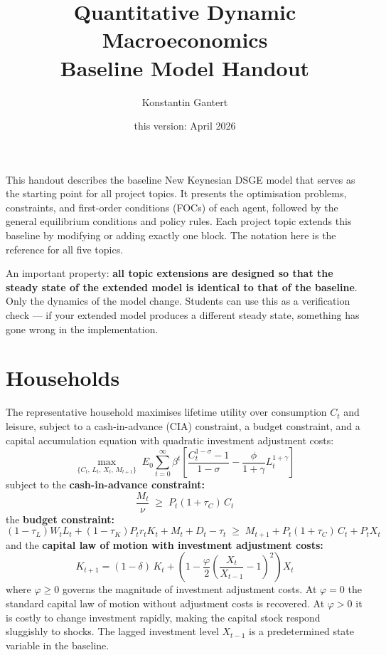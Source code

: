 \documentclass[11pt, a4paper]{article}
\title{\textbf{Quantitative Dynamic Macroeconomics}\\[0.4em]
\large Baseline Model Handout}
\author{Konstantin Gantert}
\date{this version: April 2026}
\begin{document}
\maketitle

This handout describes the baseline New Keynesian DSGE model that serves as the
starting point for all project topics. It presents the optimisation problems,
constraints, and first-order conditions (FOCs) of each agent, followed by the
general equilibrium conditions and policy rules. Each project topic extends this
baseline by modifying or adding exactly one block. The notation here is the
reference for all five topics.

An important property: \textbf{all topic extensions are designed so that
the steady state of the extended model is identical to that of the baseline}.
Only the dynamics of the model change. Students can use this as a verification
check --- if your extended model produces a different steady state, something
has gone wrong in the implementation.

\section{Households}

The representative household maximises lifetime utility over consumption $C_t$
and leisure, subject to a cash-in-advance (CIA) constraint, a budget constraint,
and a capital accumulation equation with quadratic investment adjustment costs:
%
\begin{equation}
    \max_{\{C_t,\,L_t,\,X_t,\,M_{t+1}\}} \;
    E_0 \sum_{t=0}^{\infty} \beta^t
    \left[
        \frac{C_t^{1-\sigma}-1}{1-\sigma}
        -
        \frac{\phi}{1+\gamma} L_t^{1+\gamma}
    \right]
\end{equation}
%
subject to the \textbf{cash-in-advance constraint:}
\begin{equation}
    \frac{M_t}{\nu} \;\geq\; P_t(1+\tau_C)\,C_t
    \label{eq:CIA}
\end{equation}
%
the \textbf{budget constraint:}
\begin{equation}
    (1-\tau_L)W_t L_t
    + (1-\tau_K)P_t r_t K_t
    + M_t + D_t - \tau_t
    \;\geq\;
    M_{t+1}
    + P_t(1+\tau_C)\,C_t
    + P_t X_t
    \label{eq:budget}
\end{equation}
%
and the \textbf{capital law of motion with investment adjustment costs:}
\begin{equation}
    K_{t+1} = (1-\delta)\,K_t
    + \left(1 - \frac{\varphi}{2}
      \left(\frac{X_t}{X_{t-1}}-1\right)^{\!2}\right) X_t
    \label{eq:capital}
\end{equation}
%
where $\varphi \geq 0$ governs the magnitude of investment adjustment costs.
At $\varphi = 0$ the standard capital law of motion without adjustment costs
is recovered. At $\varphi > 0$ it is costly to change investment rapidly,
making the capital stock respond sluggishly to shocks. The lagged investment
level $X_{t-1}$ is a predetermined state variable in the baseline.
\end{document}
